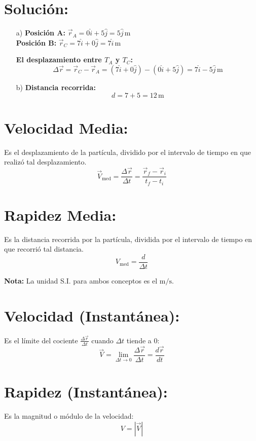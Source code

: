 \section{Solución:}
\begin{enumerate}
    \item[a)] \textbf{Posición A:} $\vec{r}_A = 0 \hat{i} + 5 \hat{j} = 5 \hat{j} \, \text{m}$ \\
    \textbf{Posición B:} $\vec{r}_C = 7 \hat{i} + 0 \hat{j} = 7 \hat{i} \, \text{m}$
    
    \medskip
    \textbf{El desplazamiento entre $T_A$ y $T_C$:}
    \[
    \Delta \vec{r} = \vec{r}_C - \vec{r}_A = (7 \hat{i} + 0 \hat{j}) - (0 \hat{i} + 5 \hat{j}) = 7 \hat{i} - 5 \hat{j} \, \text{m}
    \]

    \item[b)] \textbf{Distancia recorrida:}
    \[
    d = 7 + 5 = 12 \, \text{m}
    \]
\end{enumerate}

\section{Velocidad Media:}
Es el desplazamiento de la partícula, dividido por el intervalo de tiempo en que realizó tal desplazamiento.
\[
\vec{V}_{\text{med}} = \frac{\Delta \vec{r}}{\Delta t} = \frac{\vec{r}_f - \vec{r}_i}{t_f - t_i}
\]

\section{Rapidez Media:}
Es la distancia recorrida por la partícula, dividida por el intervalo de tiempo en que recorrió tal distancia.
\[
V_{\text{med}} = \frac{d}{\Delta t}
\]

\bigskip
\noindent\textbf{Nota:} La unidad S.I. para ambos conceptos es el \(\text{m/s}\).

\section{Velocidad (Instantánea):}
Es el límite del cociente $\frac{\Delta \vec{r}}{\Delta t}$ cuando $\Delta t$ tiende a $0$:
\[
\vec{V} = \lim_{\Delta t \to 0} \frac{\Delta \vec{r}}{\Delta t} = \frac{d \vec{r}}{d t}
\]

\section{Rapidez (Instantánea):}
Es la magnitud o módulo de la velocidad:
\[
V = |\vec{V}|
\]

